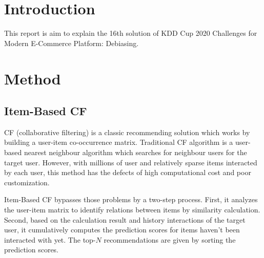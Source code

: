 \documentclass[manuscript,noacm]{acmart}
\begin{document}


\maketitle

\section{Introduction}
This report is aim to explain the 16th solution of KDD Cup 2020 Challenges for Modern E-Commerce Platform: Debiasing.

\section{Method}
\subsection{Item-Based CF}
CF (collaborative filtering) is a classic recommending solution which works by building a user-item co-occurrence matrix. Traditional CF algorithm is a user-based nearest neighbour algorithm which searches for neighbour users for the target user\cite{goldberg1992using}. However, with millions of user and relatively sparse items interacted by each user, this method has the defects of high computational cost and poor customization.


Item-Based CF bypasses those problems by a two-step process. First, it analyzes the user-item matrix to identify relations between items by similarity calculation. Second, based on the calculation result and history interactions of the target user, it cumulatively computes the prediction scores for items haven't been interacted with yet\cite{sarwar2001item}. The top-$N$ recommendations are given by sorting the prediction scores.
\end{document}

